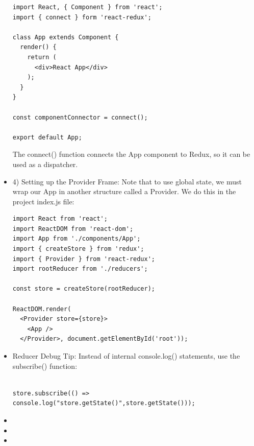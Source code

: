 \documentclass[8pt,a4paper]{extarticle}
\begin{document}
\begin{itemize}
\begin{verbatim}
import React, { Component } from 'react';
import { connect } form 'react-redux';

class App extends Component {
  render() {
    return (
      <div>React App</div>
    );
  }
}

const componentConnector = connect();

export default App;
\end{verbatim}

The connect() function connects the App component to Redux, so it can be used as a dispatcher.

\item 4) Setting up the Provider Frame: Note that to use global state, we must wrap our App in another structure called a Provider. We do this in the project index.js file:

\begin{verbatim}
import React from 'react';
import ReactDOM from 'react-dom';
import App from './components/App';
import { createStore } from 'redux';
import { Provider } from 'react-redux'; 
import rootReducer from './reducers';

const store = createStore(rootReducer);

ReactDOM.render(
  <Provider store={store}>
    <App />
  </Provider>, document.getElementById('root'));

\end{verbatim}


\item Reducer Debug Tip: Instead of internal console.log() statements, use the subscribe() function:

\begin{verbatim}

store.subscribe(() => console.log("store.getState()",store.getState()));

\end{verbatim}

\item
\item
\item
\end{itemize}

\section{}

\subsection{}
\end{document}
